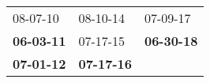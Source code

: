 \begin{supertabular}{p{0.33\columnwidth}p{0.33\columnwidth}p{0.33\columnwidth}}
          08-07-10\textsuperscript{} &           08-10-14\textsuperscript{} &           07-09-17\textsuperscript{} \\
 \textbf{06-03-11\textsuperscript{}} &           07-17-15\textsuperscript{} &  \textbf{06-30-18\textsuperscript{}} \\
 \textbf{07-01-12\textsuperscript{}} &  \textbf{07-17-16\textsuperscript{}} &                                      \\
\end{supertabular}
